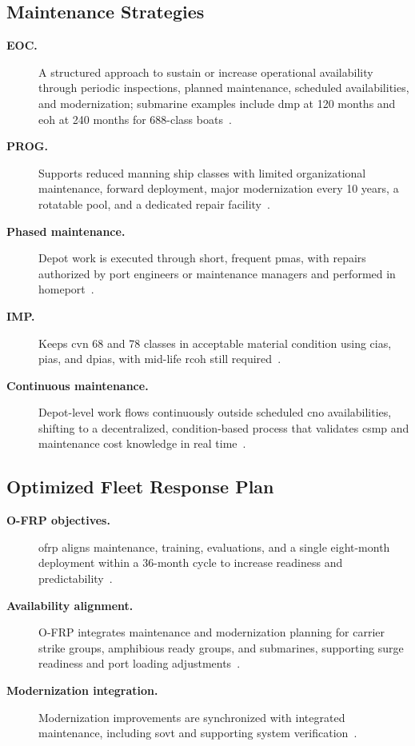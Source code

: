 \documentclass[../main.tex]{subfiles}
\begin{document}
\subsection{Maintenance Strategies}
\begin{description}
  \item[\textbf{EOC.}] A structured approach to sustain or increase operational availability through periodic inspections, planned maintenance, scheduled availabilities, and modernization; submarine examples include \ac{dmp} at 120 months and \ac{eoh} at 240 months for 688-class boats~\autocite{edo-4-1-3-fleet-maint-policy-2025}.
  \item[\textbf{PROG.}] Supports reduced manning ship classes with limited organizational maintenance, forward deployment, major modernization every 10 years, a rotatable pool, and a dedicated repair facility~\autocite{edo-4-1-3-fleet-maint-policy-2025}.
  \item[\textbf{Phased maintenance.}] Depot work is executed through short, frequent \acp{pma}, with repairs authorized by port engineers or maintenance managers and performed in homeport~\autocite{edo-4-1-3-fleet-maint-policy-2025}.
  \item[\textbf{IMP.}] Keeps \ac{cvn} 68 and 78 classes in acceptable material condition using \acp{cia}, \acp{pia}, and \acp{dpia}, with mid-life \ac{rcoh} still required~\autocite{edo-4-1-3-fleet-maint-policy-2025}.
  \item[\textbf{Continuous maintenance.}] Depot-level work flows continuously outside scheduled \ac{cno} availabilities, shifting to a decentralized, condition-based process that validates \ac{csmp} and maintenance cost knowledge in real time~\autocite{edo-4-1-3-fleet-maint-policy-2025}.
\end{description}

\subsection{Optimized Fleet Response Plan}
\begin{description}
  \item[\textbf{O-FRP objectives.}] \ac{ofrp} aligns maintenance, training, evaluations, and a single eight-month deployment within a 36-month cycle to increase readiness and predictability~\autocite{edo-4-1-3-fleet-maint-policy-2025}.
  \item[\textbf{Availability alignment.}] O-FRP integrates maintenance and modernization planning for carrier strike groups, amphibious ready groups, and submarines, supporting surge readiness and port loading adjustments~\autocite{edo-4-1-3-fleet-maint-policy-2025}.
  \item[\textbf{Modernization integration.}] Modernization improvements are synchronized with integrated maintenance, including \ac{sovt} and supporting system verification~\autocite{edo-4-1-3-fleet-maint-policy-2025}.
\end{description}
\end{document}
